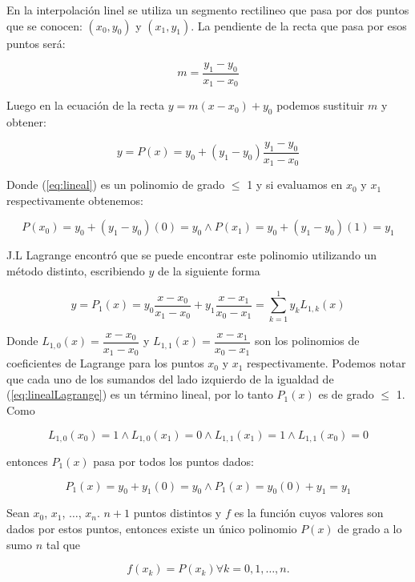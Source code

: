En la interpolación linel se utiliza un segmento rectilineo que pasa por dos puntos que se conocen: $(x_0, y_0)$ y $(x_1, y_1)$. La pendiente de la recta que pasa por esos puntos será: 

\begin{equation}
	 m = \dfrac{y_1 - y_0}{x_1 - x_0}
\end{equation}

Luego en la ecuación de la recta $y = m(x - x_0) + y_0$ podemos sustituir $m$ y 
obtener:

\begin{equation} \label{eq:lineal}
	 y = P(x) = y_0 + (y_1 - y_0)\dfrac{y_1 - y_0}{x_1 - x_0} 
\end{equation} 

Donde (\ref{eq:lineal}) es un polinomio de grado $\leq$ 1 y si evaluamos en $x_0$ y $x_1$ respectivamente obtenemos:

\begin{equation}
	 P(x_0) = y_0 + (y_1 - y_0)(0) = y_0 \wedge P(x_1) = y_0 + (y_1 - y_0)(1) = y_1 
\end{equation}

J.L Lagrange encontró que se puede encontrar este polinomio utilizando un método distinto, escribiendo $y$ de la siguiente forma

\begin{equation} \label{eq:linealLagrange}
	y = P_1(x) = y_0\dfrac{x - x_0}{x_1 - x_0} + y_1\dfrac{x - x_1}{x_0 - x_1} = \sum_{k=1}^{1} y_kL_{1,k}(x)
\end{equation}

Donde $L_{1,0}(x) = \dfrac{x - x_0}{x_1 - x_0}$ y $L_{1,1}(x) = \dfrac{x - x_1}{x_0 - x_1}$ son los polinomios de coeficientes de Lagrange para los puntos $x_0$ y $x_1$ respectivamente. Podemos notar que cada uno de los sumandos del lado izquierdo de la igualdad de (\ref{eq:linealLagrange}) es un término lineal, por lo tanto $P_1(x)$ es de grado $\leq$ 1. 
Como 

\begin{equation}
	L_{1,0}(x_0) = 1 \wedge L_{1,0}(x_1) = 0 \wedge L_{1,1}(x_1) = 1 \wedge L_{1,1}(x_0) = 0
\end{equation}

entonces $P_1(x)$ pasa por todos los puntos dados:

\begin{equation}
	P_1(x) = y_0 + y_1(0) = y_0 \wedge P_1(x) = y_0(0) + y_1 = y_1 
\end{equation}

\begin{theorem}
	\item Sean $x_0$, $x_1$, $\dots$, $x_n$. $n + 1$ puntos distintos y $f$ es la función cuyos valores son dados por estos puntos, entonces existe un único polinomio $P(x)$ de grado a lo sumo $n$ tal que 
\end{theorem}
\begin{equation}
	f(x_k) = P(x_k) \forall k = 0, 1, \dots, n.
\end{equation}

